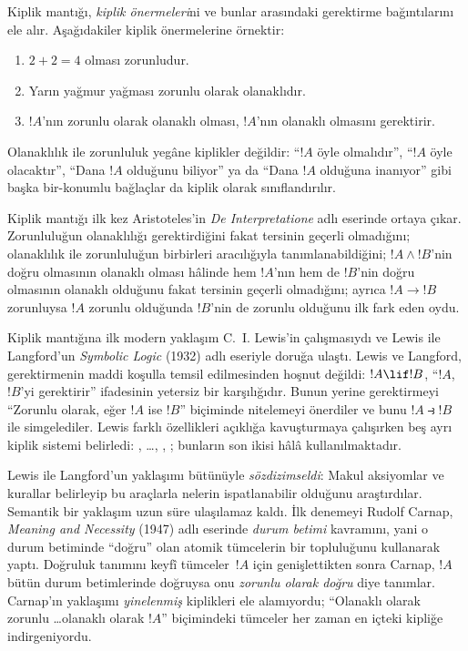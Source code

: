 \documentclass[../../../include/open-logic-section]{subfiles}
\begin{document}


Kiplik mantığı, \emph{kiplik önermeleri}ni ve bunlar arasındaki gerektirme
bağıntılarını ele alır. Aşağıdakiler kiplik önermelerine örnektir:
\begin{enumerate}
\item $2+2=4$ olması zorunludur.
\item Yarın yağmur yağması zorunlu olarak olanaklıdır.
\item $!A$'nın zorunlu olarak olanaklı olması, $!A$'nın olanaklı olmasını
  gerektirir.
\end{enumerate}
Olanaklılık ile zorunluluk yegâne kiplikler değildir: ``$!A$ öyle
olmalıdır'', ``$!A$ öyle olacaktır'', ``Dana $!A$ olduğunu biliyor'' ya da
``Dana $!A$ olduğuna inanıyor'' gibi başka bir-konumlu bağlaçlar da kiplik
olarak sınıflandırılır.

Kiplik mantığı ilk kez Aristoteles'in \emph{De Interpretatione} adlı
eserinde ortaya çıkar. Zorunluluğun olanaklılığı gerektirdiğini fakat tersinin
geçerli olmadığını; olanaklılık ile zorunluluğun birbirleri aracılığıyla
tanımlanabildiğini; $!A \land !B$'nin doğru olmasının olanaklı olması hâlinde
hem $!A$'nın hem de $!B$'nin doğru olmasının olanaklı olduğunu fakat tersinin
geçerli olmadığını; ayrıca $!A \to !B$ zorunluysa $!A$ zorunlu olduğunda
$!B$'nin de zorunlu olduğunu ilk fark eden oydu.

Kiplik mantığına ilk modern yaklaşım C.~I. Lewis'in çalışmasıydı ve Lewis ile
Langford'un \emph{Symbolic Logic} (1932) adlı eseriyle doruğa ulaştı. Lewis
ve Langford, gerektirmenin maddi koşulla temsil edilmesinden hoşnut değildi:
$!A \lif !B$, ``$!A$, $!B$'yi gerektirir'' ifadesinin yetersiz bir
karşılığıdır. Bunun yerine gerektirmeyi ``Zorunlu olarak, eğer $!A$ ise
$!B$'' biçiminde nitelemeyi önerdiler ve bunu $!A \strictif !B$ ile
simgelediler. Lewis farklı özellikleri açıklığa kavuşturmaya çalışırken beş
ayrı kiplik sistemi belirledi: , \ldots, , ;
bunların son ikisi hâlâ kullanılmaktadır.

Lewis ile Langford'un yaklaşımı bütünüyle \emph{sözdizimseldi}: Makul
aksiyomlar ve kurallar belirleyip bu araçlarla nelerin ispatlanabilir olduğunu
araştırdılar. Semantik bir yaklaşım uzun süre ulaşılamaz kaldı. İlk denemeyi
Rudolf Carnap, \emph{Meaning and Necessity} (1947) adlı eserinde
\emph{durum betimi} kavramını, yani o durum betiminde ``doğru'' olan atomik
tümcelerin bir topluluğunu kullanarak yaptı. Doğruluk tanımını keyfî
tümceler~$!A$ için genişlettikten sonra Carnap, $!A$ bütün durum betimlerinde
doğruysa onu \emph{zorunlu olarak doğru} diye tanımlar. Carnap'ın yaklaşımı
\emph{yinelenmiş} kiplikleri ele alamıyordu; ``Olanaklı olarak zorunlu
\ldots olanaklı olarak $!A$'' biçimindeki tümceler her zaman en içteki
kipliğe indirgeniyordu.
\end{document}
